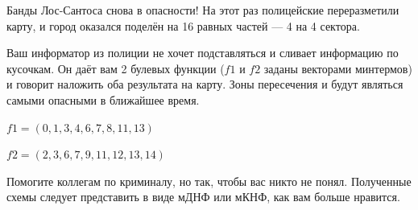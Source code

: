 \question
Банды Лос-Сантоса снова в опасности! На этот раз полицейские переразметили карту, и город оказался поделён на 16 равных частей — 4 на 4 сектора.

Ваш информатор из полиции не хочет подставляться и сливает информацию по кусочкам. Он даёт вам 2 булевых функции ($f1$ и $f2$ заданы векторами минтермов) и говорит наложить оба результата на карту. Зоны пересечения и будут являться самыми опасными в ближайшее время.

\begin{center}
$f1=(0,1,3,4,6,7,8,11,13)$

$f2=(2,3,6,7,9,11,12,13,14)$
\end{center}

Помогите коллегам по криминалу, но так, чтобы вас никто не понял. Полученные схемы следует представить в виде мДНФ или мКНФ, как вам больше нравится.